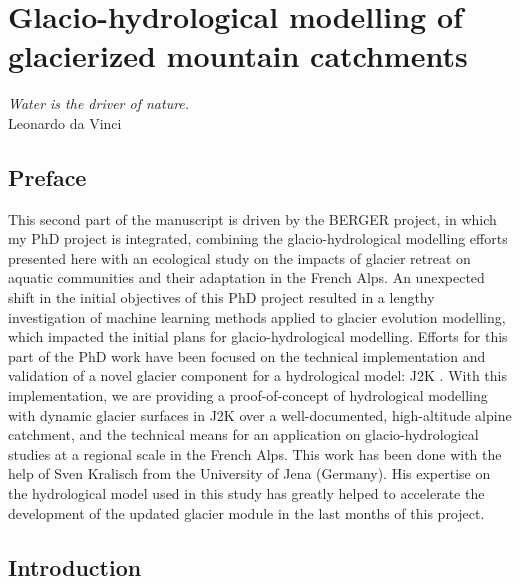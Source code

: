 \chapter{Glacio-hydrological modelling of glacierized mountain catchments}
\label{chap:discussion}

\begin{flushright}
\begin{small}
\textit{Water is the driver of nature.}\\
Leonardo da Vinci
\end{small}
\end{flushright}

\section*{Preface}

This second part of the manuscript is driven by the BERGER project, in which my PhD project is integrated, combining the glacio-hydrological modelling efforts presented here with an ecological study on the impacts of glacier retreat on aquatic communities and their adaptation in the French Alps. An unexpected shift in the initial objectives of this PhD project resulted in a lengthy investigation of machine learning methods applied to glacier evolution modelling, which impacted the initial plans for glacio-hydrological modelling. Efforts for this part of the PhD work have been focused on the technical implementation and validation of a novel glacier component for a hydrological model: J2K \citep{krause_quantifying_2002}. With this implementation, we are providing a proof-of-concept of hydrological modelling with dynamic glacier surfaces in J2K over a well-documented, high-altitude alpine catchment, and the technical means for an application on glacio-hydrological studies at a regional scale in the French Alps. This work has been done with the help of Sven Kralisch from the University of Jena (Germany). His expertise on the hydrological model used in this study has greatly helped to accelerate the development of the updated glacier module in the last months of this project. 

\section{Introduction}

